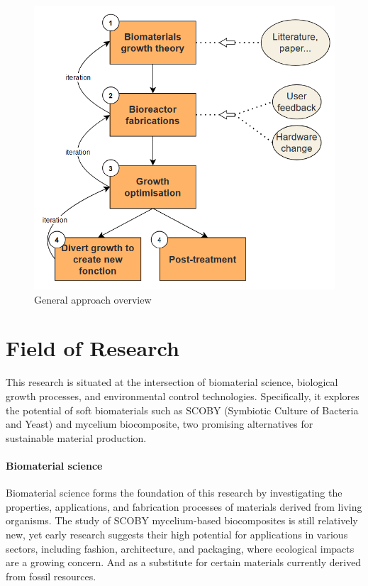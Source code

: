 \begin{figure}[h]
    \centering
    \includegraphics{images/diag_approche.png}
    \caption{General approach overview}
    \label{fig:IS_demo}
\end{figure}


\section{Field of Research}

This research is situated at the intersection of biomaterial science, biological growth processes, and environmental control technologies. Specifically, 
it explores the potential of soft biomaterials such as SCOBY (Symbiotic Culture of Bacteria and Yeast) and mycelium biocomposite, two promising alternatives 
for sustainable material production. 

\paragraph[short]{Biomaterial science} 
Biomaterial science forms the foundation of this research by investigating the properties, applications, and fabrication processes of materials derived from living organisms. 
The study of SCOBY mycelium-based biocomposites is still relatively new, yet early research suggests their high potential for applications in various sectors, including fashion\cite{amobonye2023fungal}, architecture\cite{ghazvinian2019mycelium}, and packaging\cite{abhijith2018sustainable}, where ecological impacts are a growing concern. And as a substitute for certain materials currently derived from fossil resources\cite{jang2017bacterial}.

